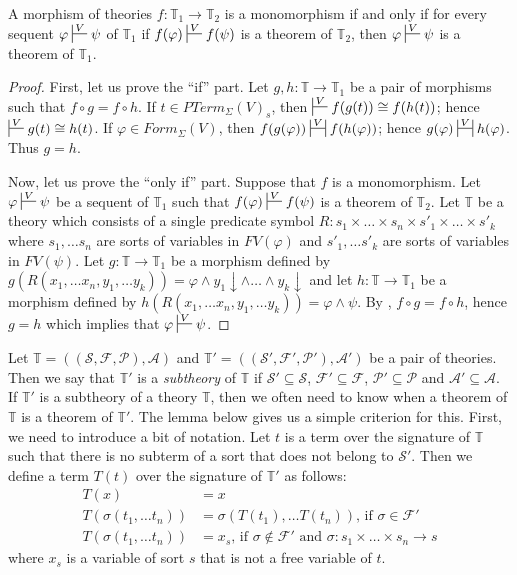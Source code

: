 \documentclass[reqno]{amsart}
\theoremstyle{definition}
\theoremstyle{remark}
\numberwithin{figure}{section}
\begin{document}
\begin{prop}
A morphism of theories $f : \mathbb{T}_1 \to \mathbb{T}_2$ is a monomorphism if and only if for every sequent $\varphi \sststile{}{V} \psi$ of $\mathbb{T}_1$
if $f(\varphi) \sststile{}{V} f(\psi)$ is a theorem of $\mathbb{T}_2$, then $\varphi \sststile{}{V} \psi$ is a theorem of $\mathbb{T}_1$.
\end{prop}
\begin{proof}
First, let us prove the ``if'' part.
Let $g,h : \mathbb{T} \to \mathbb{T}_1$ be a pair of morphisms such that $f \circ g = f \circ h$.
If $t \in PTerm_\Sigma(V)_s$, then $\sststile{}{V} f(g(t)) \cong f(h(t))$; hence $\sststile{}{V} g(t) \cong h(t)$.
If $\varphi \in Form_\Sigma(V)$, then $f(g(\varphi)) \ssststile{}{V} f(h(\varphi))$; hence $g(\varphi) \ssststile{}{V} h(\varphi)$.
Thus $g = h$.

Now, let us prove the ``only if'' part.
Suppose that $f$ is a monomorphism.
Let $\varphi \sststile{}{V} \psi$ be a sequent of $\mathbb{T}_1$ such that $f(\varphi) \sststile{}{V} f(\psi)$ is a theorem of $\mathbb{T}_2$.
Let $\mathbb{T}$ be a theory which consists of a single predicate symbol $R : s_1 \times \ldots \times s_n \times s'_1 \times \ldots \times s'_k$
where $s_1, \ldots s_n$ are sorts of variables in $FV(\varphi)$ and $s'_1, \ldots s'_k$ are sorts of variables in $FV(\psi)$.
Let $g : \mathbb{T} \to \mathbb{T}_1$ be a morphism defined by $g(R(x_1, \ldots x_n, y_1, \ldots y_k)) = \varphi \land y_1\!\downarrow \land \ldots \land y_k\!\downarrow$ and
let $h : \mathbb{T} \to \mathbb{T}_1$ be a morphism defined by $h(R(x_1, \ldots x_n, y_1, \ldots y_k)) = \varphi \land \psi$.
By , $f \circ g = f \circ h$, hence $g = h$ which implies that $\varphi \sststile{}{V} \psi$.
\end{proof}

Let $\mathbb{T} = ((\mathcal{S},\mathcal{F},\mathcal{P}),\mathcal{A})$ and $\mathbb{T}' = ((\mathcal{S}',\mathcal{F}',\mathcal{P}'),\mathcal{A}')$ be a pair of theories.
Then we say that $\mathbb{T}'$ is a \emph{subtheory} of $\mathbb{T}$ if $\mathcal{S}' \subseteq \mathcal{S}$, $\mathcal{F}' \subseteq \mathcal{F}$, $\mathcal{P}' \subseteq \mathcal{P}$ and $\mathcal{A}' \subseteq \mathcal{A}$.
If $\mathbb{T}'$ is a subtheory of a theory $\mathbb{T}$, then we often need to know when a theorem of $\mathbb{T}$ is a theorem of $\mathbb{T}'$.
The lemma below gives us a simple criterion for this.
First, we need to introduce a bit of notation.
Let $t$ is a term over the signature of $\mathbb{T}$ such that there is no subterm of a sort that does not belong to $\mathcal{S}'$.
Then we define a term $T(t)$ over the signature of $\mathbb{T}'$ as follows:
\begin{align*}
T(x) & = x \\
T(\sigma(t_1, \ldots t_n)) & = \sigma(T(t_1), \ldots T(t_n)) \text{, if $\sigma \in \mathcal{F}'$} \\
T(\sigma(t_1, \ldots t_n)) & = x_s \text{, if $\sigma \notin \mathcal{F}'$ and $\sigma : s_1 \times \ldots \times s_n \to s$}
\end{align*}
where $x_s$ is a variable of sort $s$ that is not a free variable of $t$.
\end{document}
